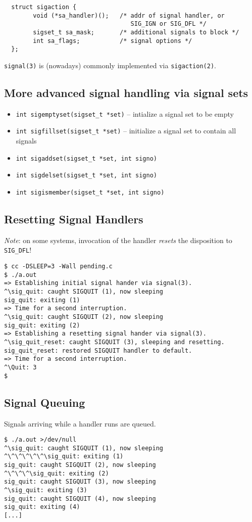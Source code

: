 \documentclass[xga]{xdvislides}
\begin{document}
\begin{verbatim}
  struct sigaction {
        void (*sa_handler)();   /* addr of signal handler, or
                                   SIG_IGN or SIG_DFL */
        sigset_t sa_mask;       /* additional signals to block */
        int sa_flags;           /* signal options */
  };
\end{verbatim}

{\tt signal(3)} is (nowadays) commonly implemented via {\tt sigaction(2)}.

\subsection{More advanced signal handling via signal sets}
\begin{itemize}
	\item {\tt int sigemptyset(sigset\_t *set)} -- intialize a signal set to be empty
	\item {\tt int sigfillset(sigset\_t *set)} -- initialize a signal set to contain all signals
	\item {\tt int sigaddset(sigset\_t *set, int signo)}
	\item {\tt int sigdelset(sigset\_t *set, int signo)}
	\item {\tt int sigismember(sigset\_t *set, int signo)}
\end{itemize}

\subsection{Resetting Signal Handlers}
{\em Note}: on some systems, invocation of the handler {\em resets} the
disposition to {\tt SIG\_DFL}!

\begin{verbatim}
$ cc -DSLEEP=3 -Wall pending.c
$ ./a.out
=> Establishing initial signal hander via signal(3).
^\sig_quit: caught SIGQUIT (1), now sleeping
sig_quit: exiting (1)
=> Time for a second interruption.
^\sig_quit: caught SIGQUIT (2), now sleeping
sig_quit: exiting (2)
=> Establishing a resetting signal hander via signal(3).
^\sig_quit_reset: caught SIGQUIT (3), sleeping and resetting.
sig_quit_reset: restored SIGQUIT handler to default.
=> Time for a second interruption.
^\Quit: 3
$
\end{verbatim}

\subsection{Signal Queuing}
Signals arriving while a handler runs are queued.
\begin{verbatim}
$ ./a.out >/dev/null
^\sig_quit: caught SIGQUIT (1), now sleeping
^\^\^\^\^\^\sig_quit: exiting (1)
sig_quit: caught SIGQUIT (2), now sleeping
^\^\^\^\sig_quit: exiting (2)
sig_quit: caught SIGQUIT (3), now sleeping
^\sig_quit: exiting (3)
sig_quit: caught SIGQUIT (4), now sleeping
sig_quit: exiting (4)
[...]
\end{verbatim}
\end{document}
